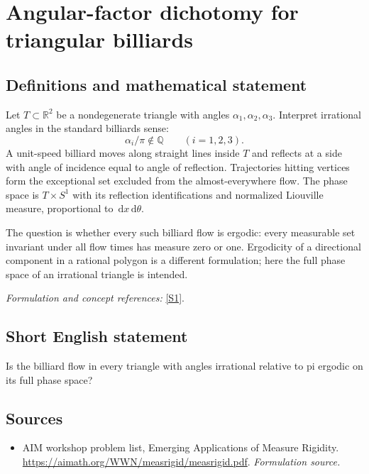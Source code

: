 \documentclass[11pt]{article}
\begin{document}
\section*{\texorpdfstring{Angular-factor dichotomy for triangular billiards}{Angular-factor dichotomy for triangular billiards}}\label{statement}
\subsection{Definitions and mathematical statement}
Let $T\subset{\mathbb{R}}^2$ be a nondegenerate triangle with angles $\alpha_1,\alpha_2,\alpha_3$. Interpret irrational angles in the standard billiards sense:
\[
 \alpha_i/\pi\notin{\mathbb{Q}}\qquad(i=1,2,3).
\]
A unit-speed billiard moves along straight lines inside $T$ and reflects at a side with angle of incidence equal to angle of reflection. Trajectories hitting vertices form the exceptional set excluded from the almost-everywhere flow. The phase space is $T\times S^1$ with its reflection identifications and normalized Liouville measure, proportional to ${\,\mathrm{d}} x{\,\mathrm{d}}\theta$.

The question is whether every such billiard flow is ergodic: every measurable set invariant under all flow times has measure zero or one. Ergodicity of a directional component in a rational polygon is a different formulation; here the full phase space of an irrational triangle is intended.
\par\smallskip\textit{Formulation and concept references:} \href{https://aimath.org/WWN/measrigid/measrigid.pdf}{[S1]}.

\subsection{Short English statement}
Is the billiard flow in every triangle with angles irrational relative to pi ergodic on its full phase space?
\subsection{Sources}
\begin{itemize}
\item[S1]AIM workshop problem list, Emerging Applications of Measure Rigidity.
\url{https://aimath.org/WWN/measrigid/measrigid.pdf}.
\textit{Formulation source.}
\end{itemize}
\end{document}
